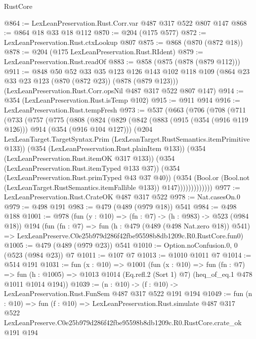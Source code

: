 \begin{lexlean}{RustCore}
\begin{coremodule}
@864 := LexLeanPreservation.Rust.Corr.var @487 @317 @522 @807 @147
@868 := @864 @18 @33 @18 @112
@870 := @204 (@175 @577)
@872 := LexLeanPreservation.Rust.ctxLookup @807
@875 := @868 (@870 (@872 @18))
@878 := @204 (@175 LexLeanPreservation.Rust.RIdent)
@879 := LexLeanPreservation.Rust.readOf
@883 := @858 (@875 (@878 (@879 @112)))
@911 := @848
    @50
    @52
    @33
    @35
    @123
    @126
    @143
    @102
    @118
    @109
    (@864 @23 @33 @23 @123 (@870 (@872 @23)) (@878 (@879 @123)))
    (LexLeanPreservation.Rust.Corr.opsNil @487 @317 @522 @807 @147)
@914 := @354 (LexLeanPreservation.Rust.isTemp @102)
@915 := @911 @914
@916 := LexLeanPreservation.Rust.tempFresh
@973 := @537
    (@663
      (@706
        (@708
          (@711
            (@733
              (@757
                (@775
                  (@808
                    (@824
                      (@829
                        (@842
                          (@883 (@915 (@354 (@916 @119 @126))) @914 (@354 (@916 @104 @127)))
                          (@204
                            LexLeanTarget.TargetSyntax.Prim
                            (LexLeanTarget.RustSemantics.itemPrimitive @133))
                          (@354 (LexLeanPreservation.Rust.plainItem @133))
                          (@354 (LexLeanPreservation.Rust.itemOK @317 @133))
                          (@354 (LexLeanPreservation.Rust.itemTyped @133 @37))
                          (@354 (LexLeanPreservation.Rust.primTyped @43 @37 @40))
                          (@354
                            (Bool.or
                              (Bool.not (LexLeanTarget.RustSemantics.itemFallible @133))
                              @147)))))))))))))
@977 := LexLeanPreservation.Rust.CrateOK @487 @317 @522
@978 := Nat.casesOn.{0}
@979 := @498 @191
@983 := @479 (@489 (@979 @18)) @541
@984 := @498 @188
@1001 := @978
    (fun (y : @10) => (fn : @7) -> (h : @983) -> @523 (@984 @18))
    @194
    (fun (fn : @7) =>
    fun (h : @479 (@489 (@498 Nat.zero @18)) @541) =>
    LexLeanPreserve.C0e25b979d286f42fbe95598b8db1209c.R0.RustCore.fun0)
@1005 := @479 (@489 (@979 @23)) @541
@1010 := Option.noConfusion.{0, 0} (@523 (@984 @23)) @7
@1011 := @107 @7
@1013 := @1010 @1011 @7
@1014 := @514 @191
@1031 := fun (x : @10) =>
  @1001
    (fun (x : @10) =>
    fun (fn : @7) =>
    fun (h : @1005) => @1013 @1014 (Eq.refl.{2} (Sort 1) @7) (heq_of_eq.{1} @478 @1011 @1014 @194))
@1039 := (n : @10) -> (f : @10) -> LexLeanPreservation.Rust.FunSem @487 @317 @522 @191 @194
@1049 := fun (n : @10) =>
  fun (f : @10) =>
  LexLeanPreservation.Rust.simulate
    @487
    @317
    @522
    LexLeanPreserve.C0e25b979d286f42fbe95598b8db1209c.R0.RustCore.crate_ok
    @191
    @194
\end{coremodule}
\end{lexlean}
